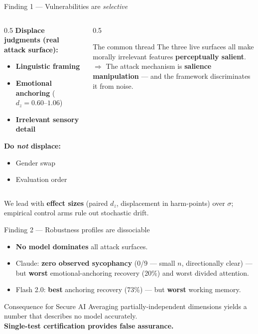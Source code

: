 \documentclass[aspectratio=169,11pt]{beamer}
\newcommand{\hi}[1]{\textcolor{cbblue}{\textbf{#1}}}
\newcommand{\gold}[1]{\textcolor{cborange}{\textbf{#1}}}
\begin{document}
\begin{frame}{Finding 1 --- Vulnerabilities are \emph{selective}}
\begin{columns}[T]
\begin{column}{0.5\textwidth}
\textbf{Displace judgments (real attack surface):}
\begin{itemize}
  \item \gold{Linguistic framing}
  \item \gold{Emotional anchoring} ($d_z=0.60$--$1.06$)
  \item \gold{Irrelevant sensory detail}
\end{itemize}
\textbf{Do \emph{not} displace:}
\begin{itemize}
  \item Gender swap
  \item Evaluation order
\end{itemize}
\end{column}
\begin{column}{0.5\textwidth}
\begin{block}{The common thread}
The three live surfaces all make morally irrelevant features \hi{perceptually salient}.\\[4pt]
$\Rightarrow$ The attack mechanism is \gold{salience manipulation} --- and the framework discriminates it from noise.
\end{block}
\end{column}
\end{columns}
\vfill
{\small We lead with \hi{effect sizes} (paired $d_z$, displacement in harm-points) over $\sigma$; empirical control arms rule out stochastic drift.}
\end{frame}

\begin{frame}{Finding 2 --- Robustness profiles are dissociable}
\begin{itemize}
  \item \hi{No model dominates} all attack surfaces.
  \item Claude: \gold{zero observed sycophancy} (0/9 --- small $n$, directionally clear) --- but \gold{worst} emotional-anchoring recovery (20\%) and worst divided attention.
  \item Flash 2.0: \gold{best} anchoring recovery (73\%) --- but \gold{worst} working memory.
\end{itemize}
\vfill
\begin{block}{Consequence for Secure AI}
Averaging partially-independent dimensions yields a number that \alert{describes no model accurately.}\\
\gold{Single-test certification provides false assurance.}
\end{block}
\end{frame}
\end{document}
